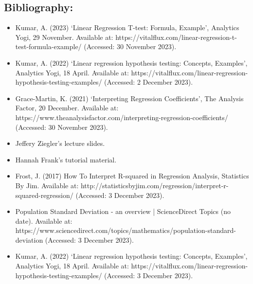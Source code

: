 \documentclass[12pt,letterpaper]{article}
\begin{document}
\begin{enumerate}
	\subsection*{Bibliography:}
	\begin{itemize}
		\item Kumar, A. (2023) ‘Linear Regression T-test: Formula, Example’, Analytics Yogi, 29 November. Available at: https://vitalflux.com/linear-regression-t-test-formula-example/ (Accessed: 30 November 2023).
		\item Kumar, A. (2022) ‘Linear regression hypothesis testing: Concepts, Examples’, Analytics Yogi, 18 April. Available at: https://vitalflux.com/linear-regression-hypothesis-testing-examples/ (Accessed: 2 December 2023).
		\item Grace-Martin, K. (2021) ‘Interpreting Regression Coefficients’, The Analysis Factor, 20 December. Available at: https://www.theanalysisfactor.com/interpreting-regression-coefficients/ (Accessed: 30 November 2023).
		\item Jeffery Ziegler's lecture slides.
		\item Hannah Frank's tutorial material.
		\item Frost, J. (2017) How To Interpret R-squared in Regression Analysis, Statistics By Jim. Available at: http://statisticsbyjim.com/regression/interpret-r-squared-regression/ (Accessed: 3 December 2023).
		\item Population Standard Deviation - an overview | ScienceDirect Topics (no date). Available at: https://www.sciencedirect.com/topics/mathematics/population-standard-deviation (Accessed: 3 December 2023).
		\item Kumar, A. (2022) ‘Linear regression hypothesis testing: Concepts, Examples’, Analytics Yogi, 18 April. Available at: https://vitalflux.com/linear-regression-hypothesis-testing-examples/ (Accessed: 3 December 2023).
		
		
	\end{itemize}
	
\end{enumerate}  
\end{document}
